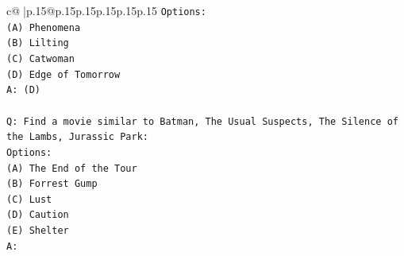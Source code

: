 \documentclass{article}
\begin{document}
{\begin{supertabular}{c@{$\;$}|p{.15\linewidth}@{}p{.15\linewidth}p{.15\linewidth}p{.15\linewidth}p{.15\linewidth}p{.15\linewidth}}
{{{\texttt{Options:} \\
\texttt{(A) Phenomena} \\
\texttt{(B) Lilting} \\
\texttt{(C) Catwoman} \\
\texttt{(D) Edge of Tomorrow} \\
\texttt{A: (D)} \\
\\ 
\texttt{Q: Find a movie similar to Batman, The Usual Suspects, The Silence of the Lambs, Jurassic Park:} \\
\texttt{Options:} \\
\texttt{(A) The End of the Tour} \\
\texttt{(B) Forrest Gump} \\
\texttt{(C) Lust} \\
\texttt{(D) Caution} \\
\texttt{(E) Shelter} \\
\texttt{A:} \\
            }
        }
    }
     \\ \\


\end{supertabular}}
\end{document}
